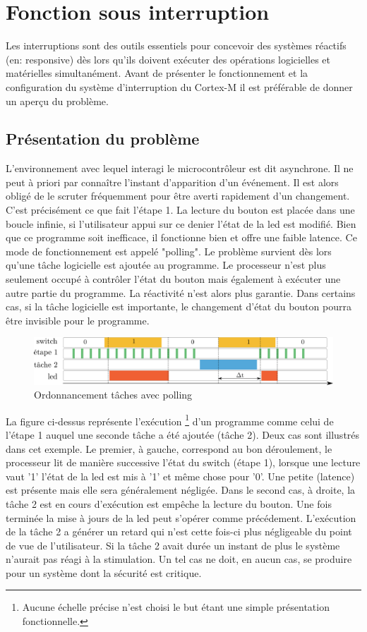 \documentclass[a4paper]{article}
\begin{document}
	
	\newpage
	
	
	\section{Fonction sous interruption}
	Les interruptions sont des outils essentiels pour concevoir des systèmes réactifs (en: responsive)  dès lors qu'ils doivent exécuter des opérations logicielles et matérielles simultanément. Avant de présenter le fonctionnement et la configuration du système d'interruption du Cortex-M il est préférable de donner un aperçu du problème.
	\subsection{Présentation du problème}
	L'environnement avec lequel interagi le microcontrôleur est dit asynchrone. Il ne peut à priori par connaître l'instant d'apparition d'un événement. Il est alors obligé de le scruter fréquemment pour être averti rapidement d'un changement. C'est précisément ce que fait l'étape 1. La lecture du bouton est placée dans une boucle infinie, si l'utilisateur appui sur ce denier l'état de la led est modifié. Bien que ce programme soit inefficace, il fonctionne bien et offre une faible latence. Ce mode de fonctionnement est appelé "polling". Le problème survient dès lors qu'une tâche logicielle est ajoutée au programme. Le processeur n'est plus seulement occupé à contrôler l'état du bouton mais également à exécuter une autre partie du programme. La réactivité n'est alors plus garantie. Dans certains cas, si la tâche logicielle est importante, le changement d'état du bouton pourra être invisible pour le programme.
	\begin{figure}[H]
		\centering
		\includegraphics[width=\linewidth]{polling_task}
		\caption{Ordonnancement tâches avec polling}
	\end{figure}
	La figure ci-dessus représente l'exécution \footnote{Aucune échelle précise n'est choisi le but étant une simple présentation fonctionnelle.} d'un programme comme celui de l'étape 1 auquel une seconde tâche a été ajoutée (tâche 2).  Deux cas sont illustrés dans cet exemple. Le premier, à gauche, correspond au bon déroulement, le processeur lit de manière successive l'état du switch (étape 1), lorsque une lecture vaut '1' l'état de la led est mis à '1' et même chose pour '0'. Une petite (latence) est présente mais elle sera généralement négligée. Dans le second cas, à droite, la tâche 2 est en cours d'exécution est empêche la lecture du bouton. Une fois terminée la mise à jours de la led peut s'opérer comme précédement. L'exécution de la tâche 2 a générer un retard qui n'est cette fois-ci plus négligeable du point de vue de l'utilisateur. Si la tâche 2 avait durée un instant de plus le système n'aurait pas réagi à la stimulation. Un tel cas ne doit, en aucun cas, se produire pour un système dont la sécurité est critique.\\
\end{document}
